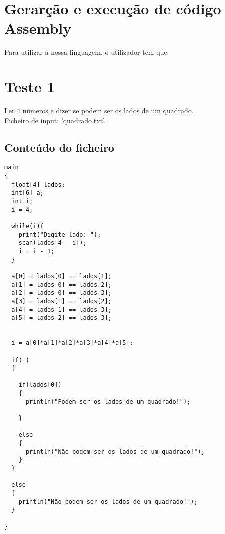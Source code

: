 \documentclass[11pt,a4paper]{report}%
\begin{document}
\section{Gerarção e execução de código Assembly}
Para utilizar a nossa linguagem, o utilizador tem que:


\section{Teste 1}
Ler 4 números e dizer se podem ser os lados de um quadrado. \\
\underline{Ficheiro de input:} 'quadrado.txt'. 

\subsection{Conteúdo do ficheiro}

\begin{verbatim}
main
{
  float[4] lados;
  int[6] a;
  int i;
  i = 4;
  
  while(i){
    print("Digite lado: ");
    scan(lados[4 - i]);
    i = i - 1;  
  }
  
  a[0] = lados[0] == lados[1];
  a[1] = lados[0] == lados[2];
  a[2] = lados[0] == lados[3];
  a[3] = lados[1] == lados[2];
  a[4] = lados[1] == lados[3];
  a[5] = lados[2] == lados[3];
  
  
  i = a[0]*a[1]*a[2]*a[3]*a[4]*a[5];
  
  if(i)
  {  
    
    if(lados[0])
    {
      println("Podem ser os lados de um quadrado!");

    }

    else
    {
      println("Não podem ser os lados de um quadrado!");
    }
  }

  else
  {
    println("Não podem ser os lados de um quadrado!");
  }

}
\end{verbatim}
\end{document}
